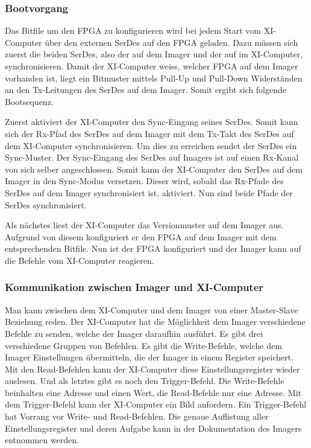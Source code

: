\subsubsection*{Bootvorgang}
\label{sec:varian_boot_sequence}
Das Bitfile um den FPGA zu konfigurieren wird bei jedem Start vom XI-Computer über den externen SerDes auf den FPGA geladen. Dazu müssen sich zuerst die beiden SerDes, also der auf dem Imager und der auf im XI-Computer, synchronisieren. Damit der XI-Computer weiss, welcher FPGA auf dem Imager vorhanden ist, liegt ein Bitmuster mittels Pull-Up und Pull-Down Widerständen an den Tx-Leitungen des SerDes auf dem Imager. Somit ergibt sich folgende Bootsequenz.

Zuerst aktiviert der XI-Computer den Sync-Eingang seines SerDes. Somit kann sich der Rx-Pfad des SerDes auf dem Imager mit dem Tx-Takt des SerDes auf dem XI-Computer synchronisieren. Um dies zu erreichen sendet der SerDes ein Sync-Muster. Der Sync-Eingang des SerDes auf Imagers ist auf einen Rx-Kanal von sich selber angeschlossen. Somit kann der XI-Computer den SerDes auf dem Imager in den Sync-Modus versetzen. Dieser wird, sobald das Rx-Pfade des SerDes auf dem Imager synchronisiert ist, aktiviert. Nun sind beide Pfade der SerDes synchronisiert.

Als nächstes liest der XI-Computer das Versionmuster auf dem Imager aus. Aufgrund von diesem konfiguriert er den FPGA auf dem Imager mit dem entsprechenden Bitfile. Nun ist der FPGA konfiguriert und der Imager kann auf die Befehle vom XI-Computer reagieren. 

\subsubsection*{Kommunikation zwischen Imager und XI-Computer}
\label{sec:varian_com}

Man kann zwischen dem XI-Computer und dem Imager von einer Master-Slave Beziehung reden. Der XI-Computer hat die Möglichkeit dem Imager verschiedene Befehle zu senden, welche der Imager daraufhin ausführt. Es gibt drei verschiedene Gruppen von Befehlen. Es gibt die Write-Befehle, welche dem Imager Einstellungen übermitteln, die der Imager in einem Register speichert. Mit den Read-Befehlen kann der XI-Computer diese Einstellungsregister wieder auslesen. Und als letztes gibt es noch den Trigger-Befehl. Die Write-Befehle beinhalten eine Adresse und einen Wert, die Read-Befehle nur eine Adresse. Mit dem Trigger-Befehl kann der XI-Computer ein Bild anfordern. Ein Trigger-Befehl hat Vorrang vor Write- und Read-Befehlen. Die genaue Auflistung aller Einstellungsregister und deren Aufgabe kann in der Dokumentation des Imagers entnommen werden. \cite{varian}

